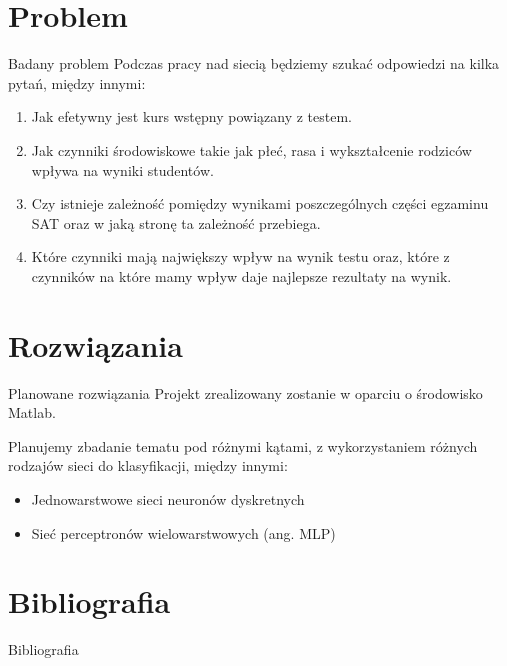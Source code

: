 \documentclass[10pt]{beamer}
\begin{document}
\section{Problem}
 
\begin{frame}{Badany problem}
Podczas pracy nad siecią będziemy szukać odpowiedzi na kilka pytań, między innymi:
\begin{enumerate}
\item Jak efetywny jest kurs wstępny powiązany z testem.
\item Jak czynniki środowiskowe takie jak płeć, rasa i wykształcenie rodziców wpływa na wyniki studentów.
\item Czy istnieje zależność pomiędzy wynikami poszczególnych części egzaminu SAT oraz w jaką stronę ta zależność przebiega.
\item Które czynniki mają największy wpływ na wynik testu oraz, które z czynników na które mamy wpływ daje najlepsze rezultaty na wynik.
\end{enumerate}

 
\end{frame}

\section{Rozwiązania}
 
\begin{frame}{Planowane rozwiązania}
Projekt zrealizowany zostanie w oparciu o środowisko Matlab.

Planujemy zbadanie tematu pod różnymi  kątami, z wykorzystaniem różnych rodzajów sieci do klasyfikacji, między innymi:
\begin{itemize}
\item Jednowarstwowe sieci neuronów dyskretnych
\item Sieć perceptronów wielowarstwowych (ang. MLP)
\end{itemize}

 
\end{frame}

\section{Bibliografia}
\begin{frame}[allowframebreaks]{Bibliografia}


\nocite{*}
\end{frame}
\end{document}

